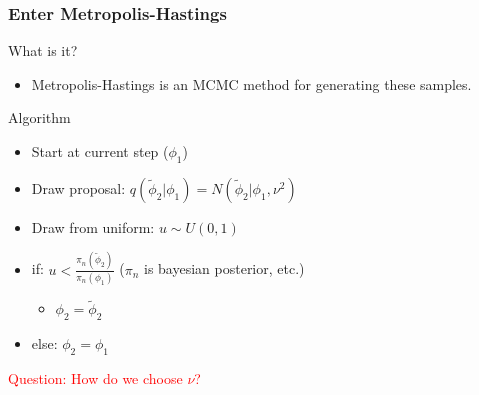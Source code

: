 \documentclass[mathserif]{beamer}
\begin{document}
\begin{frame}
\frametitle{Enter Metropolis-Hastings}

\begin{block}{What is it?}
  \begin{itemize}
  \item Metropolis-Hastings is an MCMC method for generating these samples. 
  \end{itemize}
\end{block}

\begin{block}{Algorithm}
  \begin{itemize}
  \item Start at current step ($\phi_1$)
  \item Draw proposal: $q(\tilde \phi_2 | \phi_1) = N(\tilde \phi_2 | \phi_1, \nu^2)$
  \item Draw from uniform: $u \sim U(0,1)$
  \item if: $u < \frac{\pi_n(\tilde \phi_2)}{\pi_n(\phi_1)}$ ($\pi_n$ is bayesian posterior, etc.)
    \begin{itemize}
    \item $\phi_2 = \tilde \phi_2$
    \end{itemize}
  \item else: $\phi_2 = \phi_1$
  \end{itemize}
\end{block}

\textcolor{red}{Question: How do we choose $\nu$?}

\end{frame}
\end{document}
